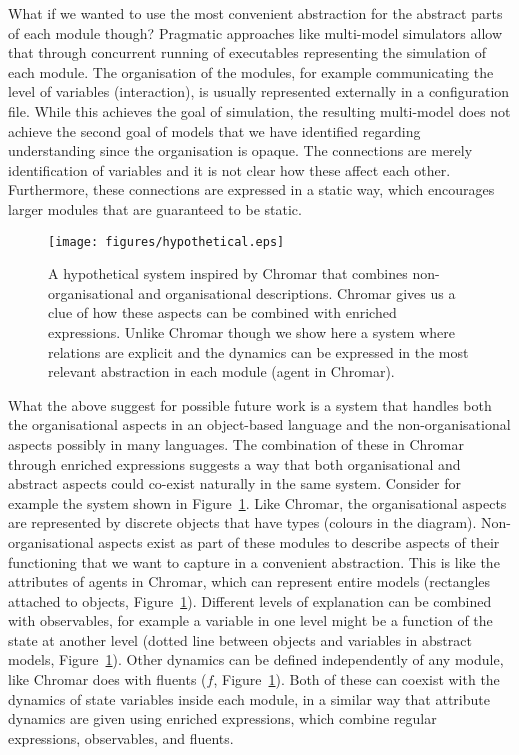 What if we wanted to use the most convenient abstraction for the abstract parts
of each module though? Pragmatic approaches like multi-model simulators
\citep{erbm_mois_2015, cis_2018} allow that through concurrent running of
executables representing the simulation of each module. The organisation of the
modules, for example communicating the level of variables (interaction), is
usually represented externally in a configuration file. While this achieves the
goal of simulation, the resulting multi-model does not achieve the second goal
of models that we have identified regarding understanding since the organisation
is opaque. The connections are merely identification of variables and it is not
clear how these affect each other. Furthermore, these connections are expressed
in a static way, which encourages larger modules that are guaranteed to be
static.

\begin{figure}[tb]
  \centering
  \texttt{[image: figures/hypothetical.eps]}
  \caption{A hypothetical system inspired by Chromar that combines
    non-organisational and organisational descriptions. Chromar gives us a clue
    of how these aspects can be combined with enriched expressions. Unlike
    Chromar though we show here a system where relations are explicit and the
    dynamics can be expressed in the most relevant abstraction in each module
    (agent in Chromar).}
    \label{fig:hyp}
\end{figure}

What the above suggest for possible future work is a system that handles both
the organisational aspects in an object-based language and the
non-organisational aspects possibly in many languages. The combination of these
in Chromar through enriched expressions suggests a way that both organisational
and abstract aspects could co-exist naturally in the same system. Consider for
example the system shown in Figure~\ref{fig:hyp}. Like Chromar, the
organisational aspects are represented by discrete objects that have types
(colours in the diagram). Non-organisational aspects exist as part of these
modules to describe aspects of their functioning that we want to capture in a
convenient abstraction. This is like the attributes of agents in Chromar, which
can represent entire models (rectangles attached to objects,
Figure~\ref{fig:hyp}). Different levels of explanation can be combined with
observables, for example a variable in one level might be a function of the
state at another level (dotted line between objects and variables in abstract
models, Figure~\ref{fig:hyp}). Other dynamics can be defined independently of
any module, like Chromar does with fluents ($f$, Figure~\ref{fig:hyp}). Both of
these can coexist with the dynamics of state variables inside each module, in a
similar way that attribute dynamics are given using enriched expressions, which
combine regular expressions, observables, and fluents.

